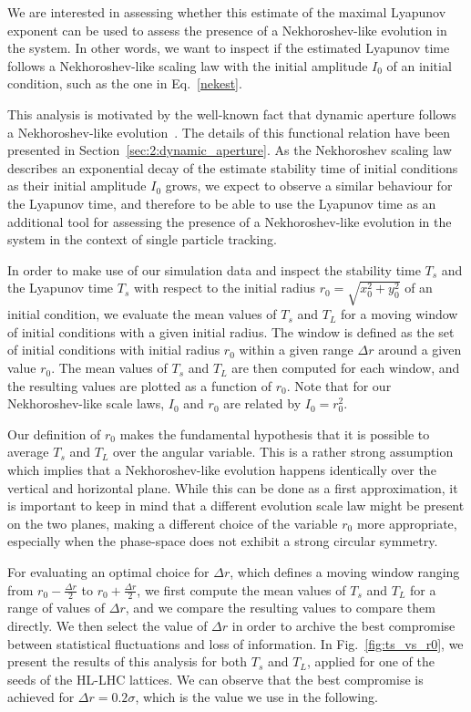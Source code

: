 We are interested in assessing whether this estimate of the maximal Lyapunov exponent can be used to assess the presence of a Nekhoroshev-like evolution in the system. In other words, we want to inspect if the estimated Lyapunov time follows a Nekhoroshev-like scaling law with the initial amplitude $I_0$ of an initial condition, such as the one in Eq.~\eqref{nekest}.

This analysis is motivated by the well-known fact that dynamic aperture follows a Nekhoroshev-like evolution~\cite{Bazzani:2019csk}. The details of this functional relation have been presented in Section~\ref{sec:2:dynamic_aperture}. As the Nekhoroshev scaling law describes an exponential decay of the estimate stability time of initial conditions as their initial amplitude $I_0$ grows, we expect to observe a similar behaviour for the Lyapunov time, and therefore to be able to use the Lyapunov time as an additional tool for assessing the presence of a Nekhoroshev-like evolution in the system in the context of single particle tracking.

In order to make use of our simulation data and inspect the stability time $T_s$ and the Lyapunov time $T_s$ with respect to the initial radius $r_0 = \sqrt{x_0^2 + y_0^2}$ of an initial condition, we evaluate the mean values of $T_s$ and $T_L$ for a moving window of initial conditions with a given initial radius. The window is defined as the set of initial conditions with initial radius $r_0$ within a given range $\Delta r$ around a given value $r_0$. The mean values of $T_s$ and $T_L$ are then computed for each window, and the resulting values are plotted as a function of $r_0$. Note that for our Nekhoroshev-like scale laws, $I_0$ and $r_0$ are related by $I_0 = r_0^2$.

Our definition of $r_0$ makes the fundamental hypothesis that it is possible to average $T_s$ and $T_L$ over the angular variable. This is a rather strong assumption which implies that a Nekhoroshev-like evolution happens identically over the vertical and horizontal plane. While this can be done as a first approximation, it is important to keep in mind that a different evolution scale law might be present on the two planes, making a different choice of the variable $r_0$ more appropriate, especially when the phase-space does not exhibit a strong circular symmetry.

For evaluating an optimal choice for $\Delta r$, which defines a moving window ranging from $r_0 - \frac{\Delta r}{2}$ to $r_0 + \frac{\Delta r}{2}$, we first compute the mean values of $T_s$ and $T_L$ for a range of values of $\Delta r$, and we compare the resulting values to compare them directly. We then select the value of $\Delta r$ in order to archive the best compromise between statistical fluctuations and loss of information. In Fig.~\ref{fig:ts_vs_r0}, we present the results of this analysis for both $T_s$ and $T_L$, applied for one of the seeds of the HL-LHC lattices. We can observe that the best compromise is achieved for $\Delta r = 0.2\sigma$, which is the value we use in the following.

